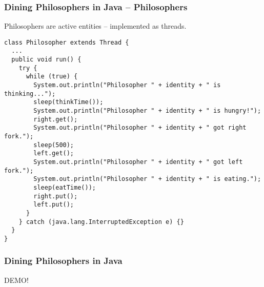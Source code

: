 \begin{frame}[t,fragile]
  \frametitle{Dining Philosophers in Java -- Philosophers}

  Philosophers are active entities -- implemented as threads.
  \vspace{.3cm}

  \begin{tcolorbox}[colback=white,colframe=DarkGreen]
  \begin{verbatim}
class Philosopher extends Thread {
  ...
  public void run() {
    try {
      while (true) {
        System.out.println("Philosopher " + identity + " is thinking...");
        sleep(thinkTime());
        System.out.println("Philosopher " + identity + " is hungry!");
        right.get();
        System.out.println("Philosopher " + identity + " got right fork.");
        sleep(500);
        left.get();
        System.out.println("Philosopher " + identity + " got left fork.");
        System.out.println("Philosopher " + identity + " is eating.");
        sleep(eatTime());
        right.put();
        left.put();
      }
    } catch (java.lang.InterruptedException e) {}
  }
}
  \end{verbatim}
  \end{tcolorbox}
\end{frame}

\begin{frame}
  \frametitle{Dining Philosophers in Java}
  \centering
  \begin{tcolorbox}[colback=white,colframe=DarkGreen]
    \centering
    \vspace{1cm}
    \Huge DEMO!
    \vspace{1cm}
  \end{tcolorbox}
\end{frame}


